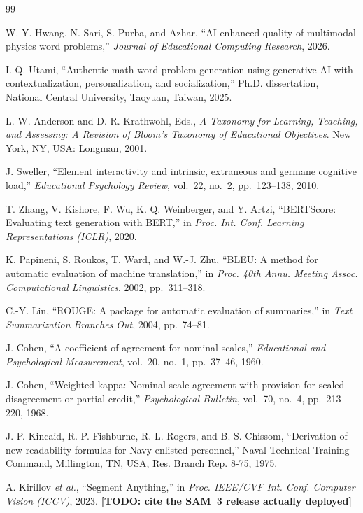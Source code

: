 \documentclass[conference]{IEEEtran}
\newcommand{\todo}[1]{{\color{red}\textbf{[TODO: #1]}}}
\begin{document}
\begin{thebibliography}{99}
\footnotesize

 W.-Y. Hwang, N. Sari, S. Purba, and Azhar,
``AI-enhanced quality of multimodal physics word problems,''
\emph{Journal of Educational Computing Research}, 2026.

 I. Q. Utami, ``Authentic math word problem generation using
generative AI with contextualization, personalization, and socialization,''
Ph.D. dissertation, National Central University, Taoyuan, Taiwan, 2025.

 L. W. Anderson and D. R. Krathwohl, Eds.,
\emph{A Taxonomy for Learning, Teaching, and Assessing: A Revision of Bloom's
Taxonomy of Educational Objectives}. New York, NY, USA: Longman, 2001.

 J. Sweller, ``Element interactivity and intrinsic, extraneous
and germane cognitive load,'' \emph{Educational Psychology Review}, vol.~22,
no.~2, pp.~123--138, 2010.

 T. Zhang, V. Kishore, F. Wu, K. Q. Weinberger, and
Y. Artzi, ``BERTScore: Evaluating text generation with BERT,'' in
\emph{Proc. Int. Conf. Learning Representations (ICLR)}, 2020.

 K. Papineni, S. Roukos, T. Ward, and W.-J. Zhu, ``BLEU: A method
for automatic evaluation of machine translation,'' in \emph{Proc. 40th Annu.
Meeting Assoc. Computational Linguistics}, 2002, pp.~311--318.

 C.-Y. Lin, ``ROUGE: A package for automatic evaluation of
summaries,'' in \emph{Text Summarization Branches Out}, 2004, pp.~74--81.

 J. Cohen, ``A coefficient of agreement for nominal scales,''
\emph{Educational and Psychological Measurement}, vol.~20, no.~1, pp.~37--46,
1960.

 J. Cohen, ``Weighted kappa: Nominal scale agreement with
provision for scaled disagreement or partial credit,''
\emph{Psychological Bulletin}, vol.~70, no.~4, pp.~213--220, 1968.

 J. P. Kincaid, R. P. Fishburne, R. L. Rogers, and B. S. Chissom,
``Derivation of new readability formulas for Navy enlisted personnel,''
Naval Technical Training Command, Millington, TN, USA, Res. Branch Rep. 8-75,
1975.

 A. Kirillov \emph{et al.}, ``Segment Anything,'' in
\emph{Proc. IEEE/CVF Int. Conf. Computer Vision (ICCV)}, 2023.
\todo{cite the SAM~3 release actually deployed}


\end{thebibliography}
\end{document}
